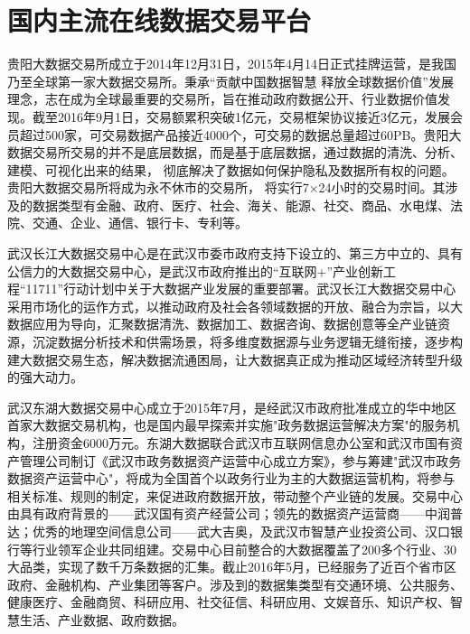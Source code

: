 \section{国内主流在线数据交易平台}

贵阳大数据交易所\cite{gbdex}成立于2014年12月31日，2015年4月14日正式挂牌运营，是我国乃至全球第一家大数据交易所。秉承“贡献中国数据智慧 释放全球数据价值”发展理念，志在成为全球最重要的交易所，旨在推动政府数据公开、行业数据价值发现。截至2016年9月1日，交易额累积突破1亿元，交易框架协议接近3亿元，发展会员超过500家，可交易数据产品接近4000个，可交易的数据总量超过60PB。贵阳大数据交易所交易的并不是底层数据，而是基于底层数据，通过数据的清洗、分析、建模、可视化出来的结果， 彻底解决了数据如何保护隐私及数据所有权的问题。 贵阳大数据交易所将成为永不休市的交易所， 将实行7×24小时的交易时间。其涉及的数据类型有金融、政府、医疗、社会、海关、能源、社交、商品、水电煤、法院、交通、企业、通信、银行卡、专利等。

武汉长江大数据交易中心是在武汉市委市政府支持下设立的、第三方中立的、具有公信力的大数据交易中心，是武汉市政府推出的“互联网+”产业创新工程“11711”行动计划中关于大数据产业发展的重要部署。武汉长江大数据交易中心采用市场化的运作方式，以推动政府及社会各领域数据的开放、融合为宗旨，以大数据应用为导向，汇聚数据清洗、数据加工、数据咨询、数据创意等全产业链资源，沉淀数据分析技术和供需场景，将多维度数据源与业务逻辑无缝衔接，逐步构建大数据交易生态，解决数据流通困局，让大数据真正成为推动区域经济转型升级的强大动力。

武汉东湖大数据交易中心\cite{chinadatatrading}成立于2015年7月，是经武汉市政府批准成立的华中地区首家大数据交易机构，也是国内最早探索并实施"政务数据运营解决方案"的服务机构，注册资金6000万元。东湖大数据联合武汉市互联网信息办公室和武汉市国有资产管理公司制订《武汉市政务数据资产运营中心成立方案》，参与筹建"武汉市政务数据资产运营中心"，将成为全国首个以政务行业为主的大数据运营机构，将参与相关标准、规则的制定，来促进政府数据开放，带动整个产业链的发展。交易中心由具有政府背景的——武汉国有资产经营公司；领先的数据资产运营商——中润普达；优秀的地理空间信息公司——武大吉奥，及武汉市智慧产业投资公司、汉口银行等行业领军企业共同组建。交易中心目前整合的大数据覆盖了200多个行业、30大品类，实现了数千万条数据的汇集。截止2016年5月，已经服务了近百个省市区政府、金融机构、产业集团等客户。涉及到的数据集类型有交通环境、公共服务、健康医疗、金融商贸、科研应用、社交征信、科研应用、文娱音乐、知识产权、智慧生活、产业数据、政府数据。


